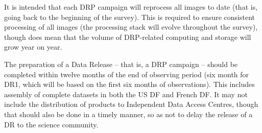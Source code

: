 It is intended that each DRP campaign will reprocess all images to date (that is, going back to the beginning of the survey). This is required to ensure consistent processing of all images (the processing stack will evolve throughout the survey), though does mean that the volume of DRP-related computing and storage will grow year on year.

The preparation of a Data Release – that is, a DRP campaign – should be completed within twelve months of the end of observing period (six month for DR1, which will be based on the first six months of observations). This includes assembly of complete datasets in both the US DF and French DF. It may not include the distribution of products to Independent Data Access Centres, though that should also be done in a timely manner, so as not to delay the release of a DR to the science community.

